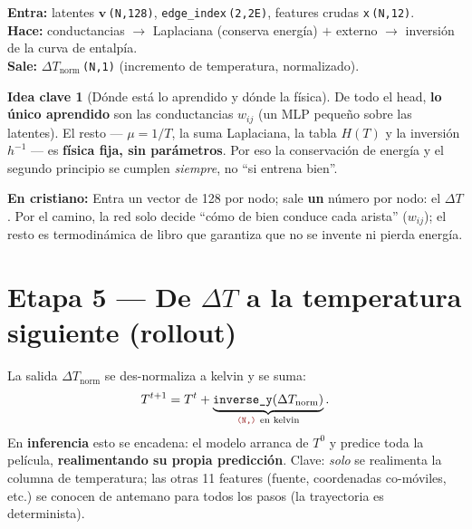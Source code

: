 \documentclass[11pt]{article}
\newcommand{\shp}[1]{{\color{shapecol}\texttt{(#1)}}}   %
\theoremstyle{definition}
\newtheorem{idea}{Idea clave}[section]
\newcommand{\dummies}[1]{%
  \par\smallskip\noindent
  \colorbox{yellow!18}{\parbox{\dimexpr\linewidth-2\fboxsep}{%
  \small\textbf{En cristiano:} #1}}\par\smallskip}
\newcommand{\io}[3]{%
  \par\smallskip\noindent
  \colorbox{blue!6}{\parbox{\dimexpr\linewidth-2\fboxsep}{\small
  \textbf{Entra:} #1 \\ \textbf{Hace:} #2 \\ \textbf{Sale:} #3}}\par\smallskip}
\begin{document}
\io{latentes $\bm v$\,\shp{N,128}, \texttt{edge\_index}\,\shp{2,2E}, features crudas
\texttt{x}\,\shp{N,12}.}
{conductancias $\to$ Laplaciana (conserva energía) $+$ externo $\to$ inversión de la
curva de entalpía.}
{$\Delta T_{\text{norm}}$\,\shp{N,1} (incremento de temperatura, normalizado).}

\begin{idea}[Dónde está lo aprendido y dónde la física]
De todo el head, \textbf{lo único aprendido} son las conductancias $w_{ij}$ (un MLP
pequeño sobre las latentes). El resto --- $\mu=1/T$, la suma Laplaciana, la tabla
$H(T)$ y la inversión $h^{-1}$ --- es \textbf{física fija, sin parámetros}. Por eso
la conservación de energía y el segundo principio se cumplen \emph{siempre}, no
``si entrena bien''.
\end{idea}

\dummies{Entra un vector de 128 por nodo; sale \textbf{un} número por nodo: el
$\Delta T$. Por el camino, la red solo decide ``cómo de bien conduce cada arista''
($w_{ij}$); el resto es termodinámica de libro que garantiza que no se invente ni
pierda energía.}

\section{Etapa 5 — De $\Delta T$ a la temperatura siguiente (rollout)}
\label{sec:rollout}

La salida $\Delta T_{\text{norm}}$ se des-normaliza a kelvin y se suma:
\[
  T^{t+1} = T^{t} + \underbrace{\texttt{inverse\_y}(\Delta T_{\text{norm}})}_{\shp{N,}\ \text{en kelvin}}.
\]
En \textbf{inferencia} esto se encadena: el modelo arranca de $T^0$ y predice toda la
película, \textbf{realimentando su propia predicción}. Clave: \emph{solo} se
realimenta la columna de temperatura; las otras 11 features (fuente, coordenadas
co-móviles, etc.) se conocen de antemano para todos los pasos (la trayectoria es
determinista).

\begin{center}
\end{center}
\end{document}
